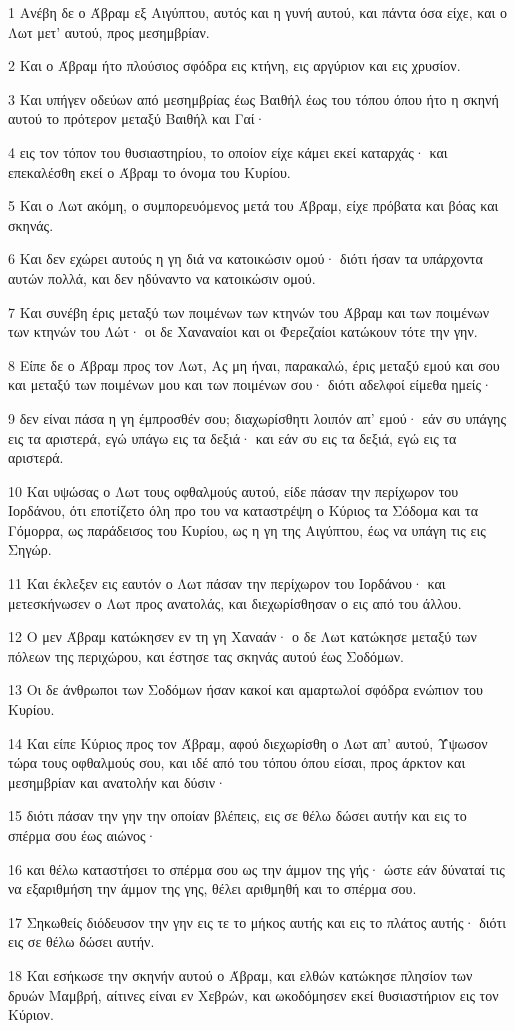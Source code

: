 \par 1 Ανέβη δε ο Άβραμ εξ Αιγύπτου, αυτός και η γυνή αυτού, και πάντα όσα είχε, και ο Λωτ μετ' αυτού, προς μεσημβρίαν.
\par 2 Και ο Άβραμ ήτο πλούσιος σφόδρα εις κτήνη, εις αργύριον και εις χρυσίον.
\par 3 Και υπήγεν οδεύων από μεσημβρίας έως Βαιθήλ έως του τόπου όπου ήτο η σκηνή αυτού το πρότερον μεταξύ Βαιθήλ και Γαί·
\par 4 εις τον τόπον του θυσιαστηρίου, το οποίον είχε κάμει εκεί καταρχάς· και επεκαλέσθη εκεί ο Άβραμ το όνομα του Κυρίου.
\par 5 Και ο Λωτ ακόμη, ο συμπορευόμενος μετά του Άβραμ, είχε πρόβατα και βόας και σκηνάς.
\par 6 Και δεν εχώρει αυτούς η γη διά να κατοικώσιν ομού· διότι ήσαν τα υπάρχοντα αυτών πολλά, και δεν ηδύναντο να κατοικώσιν ομού.
\par 7 Και συνέβη έρις μεταξύ των ποιμένων των κτηνών του Άβραμ και των ποιμένων των κτηνών του Λώτ· οι δε Χαναναίοι και οι Φερεζαίοι κατώκουν τότε την γην.
\par 8 Είπε δε ο Άβραμ προς τον Λωτ, Ας μη ήναι, παρακαλώ, έρις μεταξύ εμού και σου και μεταξύ των ποιμένων μου και των ποιμένων σου· διότι αδελφοί είμεθα ημείς·
\par 9 δεν είναι πάσα η γη έμπροσθέν σου; διαχωρίσθητι λοιπόν απ' εμού· εάν συ υπάγης εις τα αριστερά, εγώ υπάγω εις τα δεξιά· και εάν συ εις τα δεξιά, εγώ εις τα αριστερά.
\par 10 Και υψώσας ο Λωτ τους οφθαλμούς αυτού, είδε πάσαν την περίχωρον του Ιορδάνου, ότι εποτίζετο όλη προ του να καταστρέψη ο Κύριος τα Σόδομα και τα Γόμορρα, ως παράδεισος του Κυρίου, ως η γη της Αιγύπτου, έως να υπάγη τις εις Σηγώρ.
\par 11 Και έκλεξεν εις εαυτόν ο Λωτ πάσαν την περίχωρον του Ιορδάνου· και μετεσκήνωσεν ο Λωτ προς ανατολάς, και διεχωρίσθησαν ο εις από του άλλου.
\par 12 Ο μεν Άβραμ κατώκησεν εν τη γη Χαναάν· ο δε Λωτ κατώκησε μεταξύ των πόλεων της περιχώρου, και έστησε τας σκηνάς αυτού έως Σοδόμων.
\par 13 Οι δε άνθρωποι των Σοδόμων ήσαν κακοί και αμαρτωλοί σφόδρα ενώπιον του Κυρίου.
\par 14 Και είπε Κύριος προς τον Άβραμ, αφού διεχωρίσθη ο Λωτ απ' αυτού, Ύψωσον τώρα τους οφθαλμούς σου, και ιδέ από του τόπου όπου είσαι, προς άρκτον και μεσημβρίαν και ανατολήν και δύσιν·
\par 15 διότι πάσαν την γην την οποίαν βλέπεις, εις σε θέλω δώσει αυτήν και εις το σπέρμα σου έως αιώνος·
\par 16 και θέλω καταστήσει το σπέρμα σου ως την άμμον της γής· ώστε εάν δύναταί τις να εξαριθμήση την άμμον της γης, θέλει αριθμηθή και το σπέρμα σου.
\par 17 Σηκωθείς διόδευσον την γην εις τε το μήκος αυτής και εις το πλάτος αυτής· διότι εις σε θέλω δώσει αυτήν.
\par 18 Και εσήκωσε την σκηνήν αυτού ο Άβραμ, και ελθών κατώκησε πλησίον των δρυών Μαμβρή, αίτινες είναι εν Χεβρών, και ωκοδόμησεν εκεί θυσιαστήριον εις τον Κύριον.

